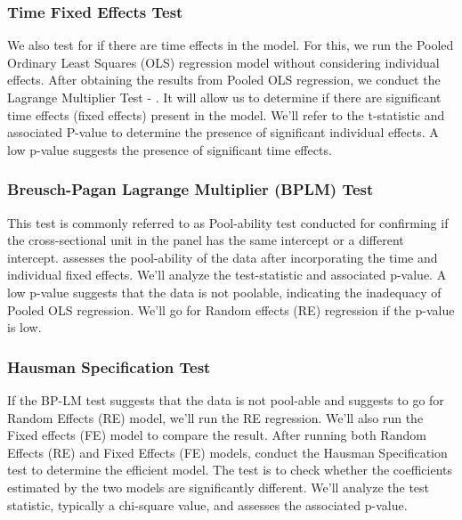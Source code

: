 \subsubsection{Time Fixed Effects Test}
We also test for if there are time effects in the model. For this, we run the Pooled Ordinary Least Squares (OLS) regression model without considering individual effects. After obtaining the results from Pooled OLS regression, we conduct the Lagrange Multiplier Test - \cite{honda1988size}. It will allow us to determine if there are significant time effects (fixed effects) present in the model. We'll refer to the t-statistic and associated P-value to determine the presence of significant individual effects.  A low p-value suggests the presence of significant time effects.\par 

\subsubsection{Breusch-Pagan Lagrange Multiplier (BPLM) Test}
This test is commonly referred to as Pool-ability test conducted for confirming if the cross-sectional unit in the panel has the same intercept or a different intercept. \cite{breusch1980lagrange} assesses the pool-ability of the data after incorporating the time and individual fixed effects. We'll analyze the test-statistic and associated p-value. A low p-value suggests that the data is not poolable, indicating the inadequacy of Pooled OLS regression. We'll go for Random effects (RE) regression if the p-value is low.

\subsubsection{Hausman Specification Test}
If the BP-LM test suggests that the data is not pool-able and suggests to go for Random Effects (RE) model, we'll run the RE regression. We'll also run the Fixed effects (FE) model to compare the result. After running both Random Effects (RE) and Fixed Effects (FE) models, conduct the Hausman Specification test \cite{hausman1978specification} to determine the efficient model. The test is to check whether the coefficients estimated by the two models are significantly different. We'll analyze the test statistic, typically a chi-square value, and assesses the associated p-value.\par 

